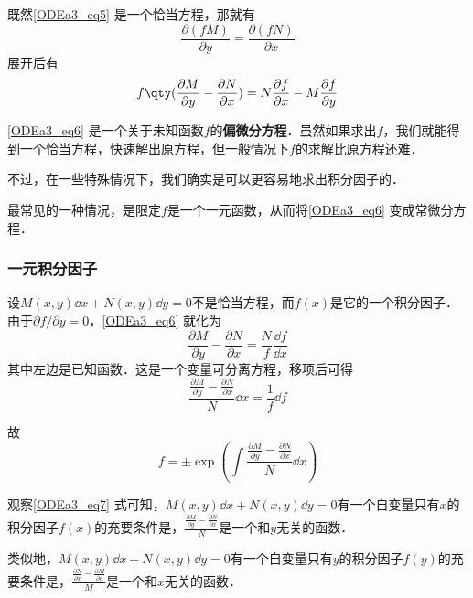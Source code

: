 既然\autoref{ODEa3_eq5} 是一个恰当方程，那就有
\begin{equation}
\frac{\partial (fM)}{\partial y}=\frac{\partial (fN)}{\partial x}
\end{equation}
展开后有
\begin{equation}\label{ODEa3_eq6}
f\qty(\frac{\partial M}{\partial y}-\frac{\partial N}{\partial x})=N\frac{\partial f}{\partial x}-M\frac{\partial f}{\partial y}
\end{equation}

\autoref{ODEa3_eq6} 是一个关于未知函数$f$的\textbf{偏微分方程}．虽然如果求出$f$，我们就能得到一个恰当方程，快速解出原方程，但一般情况下$f$的求解比原方程还难．

不过，在一些特殊情况下，我们确实是可以更容易地求出积分因子的．

最常见的一种情况，是限定$f$是一个一元函数，从而将\autoref{ODEa3_eq6} 变成常微分方程．

\subsubsection{一元积分因子}

设$M(x, y)\dd x+N(x, y)\dd y=0$不是恰当方程，而$f(x)$是它的一个积分因子．由于$\partial f/\partial y=0$，\autoref{ODEa3_eq6} 就化为
\begin{equation}
\frac{\partial M}{\partial y}-\frac{\partial N}{\partial x}=\frac{N}{f}\frac{\dd f}{\dd x}
\end{equation}
其中左边是已知函数．这是一个变量可分离方程，移项后可得
\begin{equation}
\frac{\frac{\partial M}{\partial y}-\frac{\partial N}{\partial x}}{N}\dd x=\frac{1}{f}\dd f
\end{equation}

故
\begin{equation}\label{ODEa3_eq7}
f=\pm \exp(\int \frac{\frac{\partial M}{\partial y}-\frac{\partial N}{\partial x}}{N}\dd x)
\end{equation}

观察\autoref{ODEa3_eq7} 式可知，$M(x, y)\dd x+N(x, y)\dd y=0$有一个自变量只有$x$的积分因子$f(x)$的充要条件是，$\frac{\frac{\partial M}{\partial y}-\frac{\partial N}{\partial x}}{N}$是一个和$y$无关的函数．

类似地，$M(x, y)\dd x+N(x, y)\dd y=0$有一个自变量只有$y$的积分因子$f(y)$的充要条件是，$\frac{\frac{\partial N}{\partial x}-\frac{\partial M}{\partial y}}{M}$是一个和$x$无关的函数．


